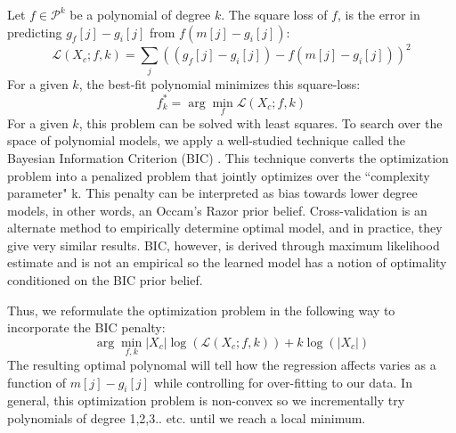 Let $f\in \mathcal{P}^k$ be a polynomial of degree $k$.
The square loss of $f$, is the error in predicting $g_f[j] - g_i[j]$ from $f(m[j] - g_i[j])$:
\begin{equation}
\mathcal{L}(X_c;f,k) = \sum_j ((g_f[j] - g_i[j]) - f(m[j] - g_i[j]))^2 
\end{equation}
For a given $k$, the best-fit polynomial minimizes this square-loss:
\begin{equation}
f^*_k =\arg \min_f \mathcal{L}(X_c;f,k)
\end{equation}
For a given $k$, this problem can be solved with least squares.
To search over the space of polynomial models, we apply a well-studied technique called the Bayesian Information Criterion (BIC) \cite{schwarz1978estimating,burnham2002model}.
This technique converts the optimization problem into a penalized problem that jointly optimizes over the ``complexity parameter" k.
This penalty can be interpreted as bias towards lower degree models, in other words, an Occam's Razor prior belief. 
Cross-validation is an alternate method to empirically determine optimal model, and in practice, they give very similar results.
BIC, however, is derived through maximum likelihood estimate and is not an empirical so the learned model has a notion of optimality conditioned on the BIC prior belief.

Thus, we reformulate the optimization problem in the following way to incorporate the BIC penalty:
\begin{equation}
\arg \min_{f,k} |X_c|\log(\mathcal{L}(X_c;f,k)) + k\log(|X_c|)
\end{equation}
The resulting optimal polynomal will tell how the regression affects varies as a function of $m[j] - g_i[j]$ while controlling for over-fitting to our data.
In general, this optimization problem is non-convex so we incrementally try polynomials of degree 1,2,3.. etc. until we reach a local minimum.


